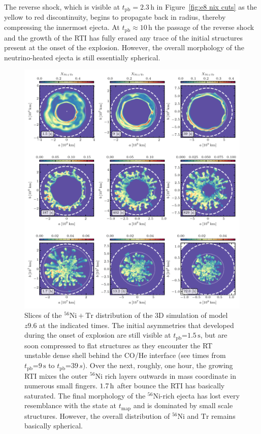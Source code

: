 \documentclass[fleqn,usenatbib]{mnras}
\newcommand{\tpb}{\ensuremath{t_{\text{pb}}}}
\newcommand{\nickel}{\ensuremath{\mathrm{^{56}Ni}}\xspace}
\newcommand{\tracer}{\ensuremath{\mathrm{Tr}}\xspace}
\newcommand{\s}{\ensuremath{\text{s}}}
\begin{document}
The reverse shock, which is visible at $\tpb=2.3\,\text{h}$ in 
Figure~\ref{fig:e8 nix cuts} as the yellow to red discontinuity, 
begins to propagate back in radius, thereby 
compressing the innermost ejecta.
At $\tpb\mathrm{\approx }10\,\text{h}$ the passage of the reverse shock and 
the growth of the RTI has fully erased any trace of the initial structures 
present at the onset of the explosion. 
However, the overall morphology of the neutrino-heated ejecta is still essentially spherical.

\begin{figure}%
 \centering
 \includegraphics[width=\textwidth,trim=0cm 0.0cm 0cm 0cm,clip]{pic/z9_3d_3x3_NiX.pdf}
 \caption{Slices of the $\nickel+ \tracer$ distribution of the 3D simulation of model
        $z9.6$ at the indicated times.
   The initial asymmetries that developed during the onset of explosion are still visible at $\tpb\mathord{=}1.5\,\s$,
   but are soon compressed to flat structures as they encounter the RT unstable dense shell behind the CO/He interface
   (see times from $\tpb\mathord{=}9\,\s$ to $\tpb\mathord{=}39\,s$). 
   Over the next, roughly, one hour, the growing RTI mixes the outer \nickel rich layers outwards in mass coordinate in numerous 
   small fingers.
   $1.7\,\rm h$ after bounce the RTI has basically saturated. The final morphology of the \nickel-rich ejecta has lost every
   resemblance with the state at $t_{\mathrm{map}}$ and is dominated by small scale structures. However, the overall 
   distribution of \nickel and \tracer remains basically spherical.
 }
 \label{fig:z9 nix cuts}
\end{figure}%
\end{document}
